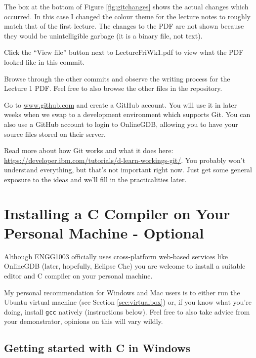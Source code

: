 \documentclass{lab}
\begin{document}
The box at the bottom of Figure \ref{fig:gitchanges} shows the actual changes which occurred. In this case I changed the colour theme for the lecture notes to roughly match that of the first lecture. The changes to the PDF are not shown because they would be unintelligible garbage (it is a binary file, not text).

Click the ``View file'' button next to LectureFriWk1.pdf to view what the PDF looked like in this commit.

Browse through the other commits and observe the writing process for the Lecture 1 PDF. Feel free to also browse the other files in the repository.

\begin{task}{}{} Go to \url{www.github.com} and create a GitHub account. You will use it in later weeks when we swap to a development environment which supports Git. You can also use a GitHub account to login to OnlineGDB, allowing you to have your source files stored on their server.
\end{task}

\begin{task}{}{} Read more about how Git works and what it does here: \url{https://developer.ibm.com/tutorials/d-learn-workings-git/}. You probably won't understand everything, but that's not important right now. Just get some general exposure to the ideas and we'll fill in the practicalities later.
\end{task}

\pagebreak
\section{Installing a C Compiler on Your Personal Machine - Optional}

Although ENGG1003 officially uses cross-platform web-based services like OnlineGDB (later, hopefully, Eclipse Che) you are welcome to install a suitable editor and C compiler on your personal machine.

My personal recommendation for Windows and Mac users is to either run the Ubuntu virtual machine (see Section \ref{sec:virtualbox}) or, if you know what you're doing, install \texttt{gcc} natively (instructions below). Feel free to also take advice from your demonstrator, opinions on this will vary wildly.

\subsection{Getting started with C in Windows}
\end{document}

